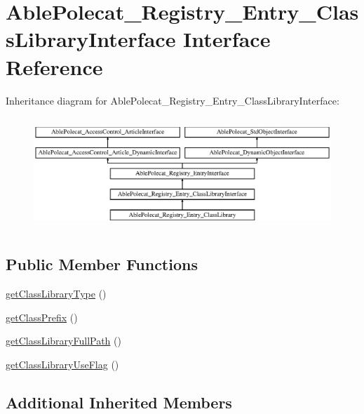 \hypertarget{interface_able_polecat___registry___entry___class_library_interface}{}\section{Able\+Polecat\+\_\+\+Registry\+\_\+\+Entry\+\_\+\+Class\+Library\+Interface Interface Reference}
\label{interface_able_polecat___registry___entry___class_library_interface}
Inheritance diagram for Able\+Polecat\+\_\+\+Registry\+\_\+\+Entry\+\_\+\+Class\+Library\+Interface\+:\begin{figure}[H]
\begin{center}
\leavevmode
\includegraphics[height=4.268293cm]{interface_able_polecat___registry___entry___class_library_interface}
\end{center}
\end{figure}
\subsection*{Public Member Functions}
\begin{DoxyCompactItemize}
\item 
\hyperlink{interface_able_polecat___registry___entry___class_library_interface_a78da81e3fa32c22602195abcf4c21d3c}{get\+Class\+Library\+Type} ()
\item 
\hyperlink{interface_able_polecat___registry___entry___class_library_interface_a2b16efeebea2966b34d452b3f53c4aea}{get\+Class\+Prefix} ()
\item 
\hyperlink{interface_able_polecat___registry___entry___class_library_interface_a826677cf6939d076fd64c902ba6c0217}{get\+Class\+Library\+Full\+Path} ()
\item 
\hyperlink{interface_able_polecat___registry___entry___class_library_interface_af40e03caa4b08fe0b0a39031aa87bd81}{get\+Class\+Library\+Use\+Flag} ()
\end{DoxyCompactItemize}
\subsection*{Additional Inherited Members}


